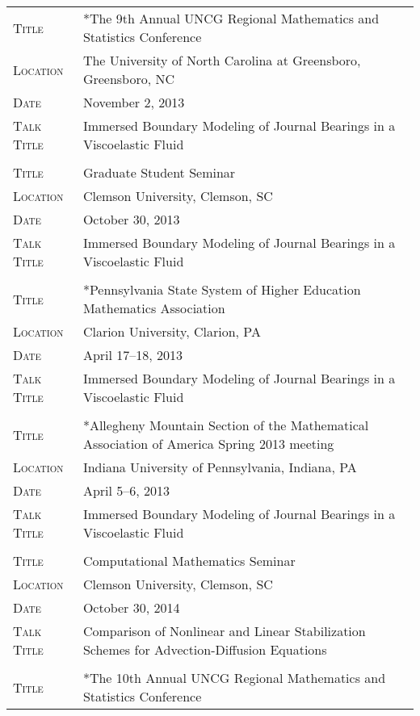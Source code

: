 \documentclass[10pt]{article}
\begin{document}
\begin{tabularx}{0.97\linewidth}{>{\raggedleft\scshape}p{3cm}X}
  Title        & *The 9th Annual UNCG Regional Mathematics and Statistics Conference\\
  Location     & The University of North Carolina at Greensboro, Greensboro, NC\\
  Date         & November 2, 2013 \\
  Talk Title   & Immersed Boundary Modeling of Journal Bearings in a Viscoelastic Fluid \\
               & \\
  Title        & Graduate Student Seminar\\
  Location     & Clemson University, Clemson, SC\\
  Date         & October 30, 2013 \\
  Talk Title   & Immersed Boundary Modeling of Journal Bearings in a Viscoelastic Fluid \\
               & \\
  Title        & *Pennsylvania State System of Higher Education Mathematics Association\\
  Location     & Clarion University, Clarion, PA\\
  Date         & April 17–18, 2013 \\
  Talk Title   & Immersed Boundary Modeling of Journal Bearings in a Viscoelastic Fluid \\
               & \\
  Title        & *Allegheny Mountain Section of the Mathematical Association of America Spring 2013 meeting \\
  Location     & Indiana University of Pennsylvania, Indiana, PA\\
  Date         & April 5–6, 2013 \\
  Talk Title   & Immersed Boundary Modeling of Journal Bearings in a Viscoelastic Fluid \\
               & \\
  Title        & Computational Mathematics Seminar\\
  Location     & Clemson University, Clemson, SC\\
  Date         & October 30, 2014 \\
  Talk Title   & Comparison of Nonlinear and Linear Stabilization Schemes for Advection-Diffusion Equations\\
               & \\
  Title        & *The 10th Annual UNCG Regional Mathematics and Statistics Conference\\

\end{tabularx}
\end{document}
